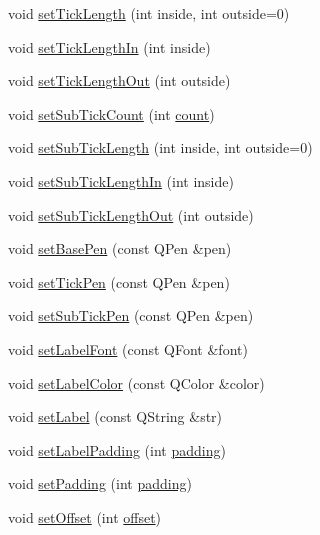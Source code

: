 \begin{DoxyCompactItemize}
\item 
void \hyperlink{classQCPAxis_a62ec40bebe3540e9c1479a8fd2be3b0d}{set\+Tick\+Length} (int inside, int outside=0)
\item 
void \hyperlink{classQCPAxis_afae1a37a99611366275a51204d991739}{set\+Tick\+Length\+In} (int inside)
\item 
void \hyperlink{classQCPAxis_a3b8a0debd1ffedd2c22d0592dfbb4e62}{set\+Tick\+Length\+Out} (int outside)
\item 
void \hyperlink{classQCPAxis_a4b1554ead9d7f9799650d51383e326dd}{set\+Sub\+Tick\+Count} (int \hyperlink{test_8cpp_ad43c3812e6d13e0518d9f8b8f463ffcf}{count})
\item 
void \hyperlink{classQCPAxis_ab702d6fd42fc620607435339a1c2a2e1}{set\+Sub\+Tick\+Length} (int inside, int outside=0)
\item 
void \hyperlink{classQCPAxis_ac46fa2a993a9f5789540977610acf1de}{set\+Sub\+Tick\+Length\+In} (int inside)
\item 
void \hyperlink{classQCPAxis_a4c6dfc3963492ed72a77724012df5f23}{set\+Sub\+Tick\+Length\+Out} (int outside)
\item 
void \hyperlink{classQCPAxis_a778d45fb71b3c7ab3bb7079e18b058e4}{set\+Base\+Pen} (const Q\+Pen \&pen)
\item 
void \hyperlink{classQCPAxis_ad80923bcc1c5da4c4db602c5325e797e}{set\+Tick\+Pen} (const Q\+Pen \&pen)
\item 
void \hyperlink{classQCPAxis_aede4028ae7516bd51a60618a8233f9cf}{set\+Sub\+Tick\+Pen} (const Q\+Pen \&pen)
\item 
void \hyperlink{classQCPAxis_a71ac1a47f7547e490a8c4311d1433cf3}{set\+Label\+Font} (const Q\+Font \&font)
\item 
void \hyperlink{classQCPAxis_a6c906fe56d75f0122335b9f79b999608}{set\+Label\+Color} (const Q\+Color \&color)
\item 
void \hyperlink{classQCPAxis_a33bcc382c111c9f31bb0687352a2dea4}{set\+Label} (const Q\+String \&str)
\item 
void \hyperlink{classQCPAxis_a4391192a766e5d20cfe5cbc17607a7a2}{set\+Label\+Padding} (int \hyperlink{classQCPAxis_abb85015a9467ec176e70698307ec833a}{padding})
\item 
void \hyperlink{classQCPAxis_a5691441cb3de9e9844855d339c0db279}{set\+Padding} (int \hyperlink{classQCPAxis_abb85015a9467ec176e70698307ec833a}{padding})
\item 
void \hyperlink{classQCPAxis_a04a652603cbe50eba9969ee6d68873c3}{set\+Offset} (int \hyperlink{classQCPAxis_aebc032ac6eea164a02859c017f52d5e7}{offset})

\end{DoxyCompactItemize}

